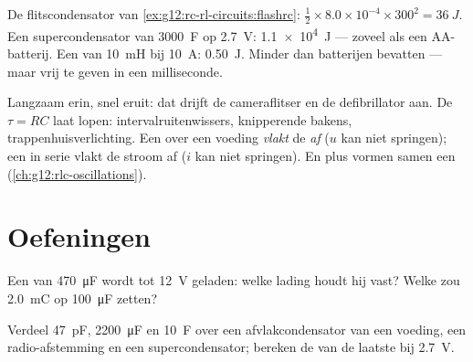 \begin{example}\label{ex:g12:rc-rl-circuits:energies}
De flitscondensator van \cref{ex:g12:rc-rl-circuits:flashrc}:
$\tfrac12 \times 8.0\times10^{-4} \times 300^2 = \qty{36}{J}$. Een
supercondensator van \qty{3000}{F} op \qty{2.7}{V}: \qty{1.1e4}{J} --- zoveel
als een AA-batterij. Een  van \qty{10}{mH} bij \qty{10}{A}:
\qty{0.50}{J}. Minder dan batterijen bevatten --- maar vrij te geven in een
milliseconde.
\end{example}

\begin{remark}\label{rem:g12:rc-rl-circuits:applications}
Langzaam erin, snel eruit: dat drijft de cameraflitser en de defibrillator
aan. De  $\tau = RC$ laat  lopen:
intervalruitenwissers, knipperende bakens, trappenhuisverlichting. Een
 over een voeding \emph{vlakt} de  \emph{af} ($u$ kan niet
springen); een  in serie vlakt de stroom af ($i$ kan niet springen). En
 plus  vormen samen een 
(\cref{ch:g12:rlc-oscillations}).
\end{remark}

\section{Oefeningen}

\begin{exercise}[$\star$]\label{exo:g12:rc-rl-circuits:1}
Een  van \qty{470}{\micro F} wordt tot \qty{12}{V} geladen: welke
lading houdt hij vast? Welke  zou \qty{2.0}{mC} op \qty{100}{\micro F}
zetten?
\end{exercise}

\begin{exercise}[$\star$]\label{exo:g12:rc-rl-circuits:2}
Verdeel \qty{47}{pF}, \qty{2200}{\micro F} en \qty{10}{F} over een
afvlakcondensator van een voeding, een radio-afstemming en een
supercondensator; bereken de  van de laatste bij \qty{2.7}{V}.
\end{exercise}


